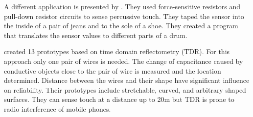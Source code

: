 A different application is presented by \cite{Smus:2010:UDT:1753846.1754094}. They used force-sensitive resistors and pull-down resistor circuits to sense percussive touch. They taped the sensor into the inside of a pair of jeans and to the sole of a shoe. They created a program that translates the sensor values to different parts of a drum. 

\citep{Wimmer:2011:MDT:2047196.2047264} created 13 prototypes based on time domain reflectometry (TDR). For this approach only one pair of wires is needed. The change of capacitance caused by conductive objects close to the pair of wire is measured and the location determined. Distance between the wires and their shape have significant influence on reliability. Their prototypes include stretchable, curved, and arbitrary shaped surfaces. They can sense touch at a distance up to 20m but TDR is prone to radio interference of mobile phones. 

